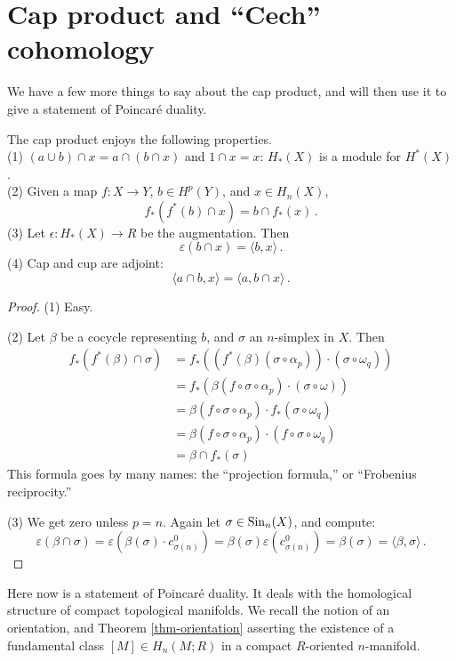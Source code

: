 \section{Cap product and ``Cech'' cohomology}

We have a few more things to say about the cap product, and will then use it
to give a statement of Poincar\'e duality. 

\begin{prop}
The cap product enjoys the following properties.\\
(1) $(a\cup b)\cap x=a\cap(b\cap x)$ and $1\cap x=x$: $H_*(X)$ is a module for
$H^*(X)$.\\
(2) Given a map $f:X\to Y$, $b\in H^p(Y)$, and $x\in H_n(X)$, 
\[
f_*(f^*(b)\cap x)=b\cap f_*(x)\,.
\]
(3) Let $\epsilon:H_*(X)\to R$ be the augmentation. Then 
\[
\varepsilon(b\cap x)=\langle b,x\rangle\,.
\]
(4) Cap and cup are adjoint:
\[
\langle a\cap b,x\rangle=\langle a,b\cap x\rangle\,.
\]
\end{prop}
\begin{proof}
(1) Easy.

\noindent
(2) Let $\beta$ be a cocycle representing $b$, and $\sigma$ an $n$-simplex
in $X$. Then
\begin{align*}
f_\ast(f^\ast(\beta)\cap\sigma)& =f_\ast(\left(f^\ast(\beta)(\sigma\circ\alpha_p)\right)\cdot(\sigma\circ\omega_q))\\
& =f_\ast(\beta(f\circ\sigma\circ\alpha_p)\cdot(\sigma\circ\omega))\\
& =\beta(f\circ\sigma\circ\alpha_p)\cdot f_\ast(\sigma\circ\omega_q)\\
& = \beta(f\circ\sigma\circ\alpha_p)\cdot(f\circ\sigma\circ\omega_q)\\
& = \beta\cap f_\ast(\sigma)
\end{align*}
This formula goes by many names: the ``projection formula,'' or ``Frobenius
reciprocity.'' 

\noindent
(3) We get zero unless $p=n$. Again let $\sigma\in\mathrm{Sin}_n(X)$, and compute:
\[
\varepsilon(\beta\cap\sigma)=\varepsilon(\beta(\sigma)\cdot c^0_{\sigma(n)})=\beta(\sigma)\varepsilon(c^0_{\sigma(n)})=\beta(\sigma)=\langle \beta,\sigma\rangle
\,.
\]
\end{proof}

Here now is a statement of Poincar\'e duality. It deals with the 
homological structure of compact topological manifolds. We recall the
notion of an orientation, and Theorem \ref{thm-orientation} asserting
the existence of a fundamental class $[M]\in H_n(M;R)$ in a compact
$R$-oriented $n$-manifold.

